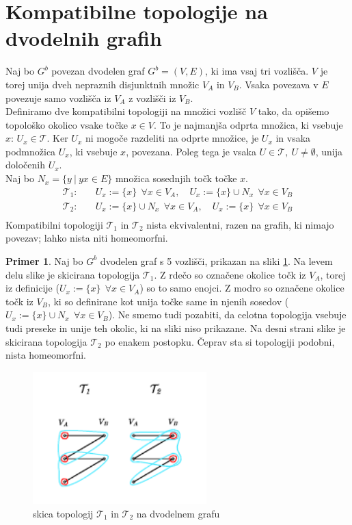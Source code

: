 \documentclass[a4paper, 12pt]{book}
\theoremstyle{definition}
\newtheorem{example}{Primer}[section]
\theoremstyle{remark}
\begin{document}
\section{Kompatibilne topologije na dvodelnih grafih}
Naj bo $G^b$ povezan dvodelen graf $G^b = (V,E)$, ki ima vsaj tri vozlišča.
$V$ je torej unija dveh nepraznih disjunktnih množic $V_A$ in $V_B$. Vsaka
povezava v $E$ povezuje samo vozlišča iz $V_A$ z vozlišči iz $V_B$.\\
Definiramo dve kompatibilni topologiji na množici vozlišč $V$ tako, da opišemo
topološko okolico vsake točke $x \in V$. To je najmanjša odprta množica, ki
vsebuje $x$: $U_x \in \mathcal{T}$. Ker $U_x$ ni mogoče razdeliti na odprte množice, je $U_x$
in vsaka podmnožica $U_x$, ki vsebuje $x$, povezana.
Poleg tega je vsaka $U \in \mathcal{T},\ U \neq \emptyset$, unija določenih $U_x$.\\
Naj bo $N_x = \{y \  | \  yx \in E\}$ množica sosednjih točk točke $x$.\\
\[
  \begin{split}
  \mathcal{T}_1:&\quad
  U_x:=\{x\}\ \ \forall x \in V_A, \quad
  U_x:=\{x\}\cup N_x\ \  \forall x \in V_B\\
  \mathcal{T}_2:&\quad
  U_x:=\{x\}\cup N_x\ \  \forall x \in V_A, \quad
  U_x:=\{x\}\ \ \forall x \in V_B\\
\end{split}
\]
Kompatibilni topologiji $\mathcal{T}_1$ in $\mathcal{T}_2$ nista ekvivalentni, razen na grafih,
ki nimajo povezav; lahko nista niti homeomorfni.
\begin{example}
  Naj bo $G^b$ dvodelen graf s 5 vozlišči, prikazan na sliki \ref{t1t2_skica}. Na levem 
  delu slike je skicirana topologija $\mathcal{T}_1$. Z rdečo so označene okolice točk iz $V_A$,
  torej iz definicije ($U_x:=\{x\}\ \ \forall x \in V_A$) so to samo enojci. Z modro so označene
  okolice točk iz $V_B$, ki so definirane kot unija točke same in njenih sosedov
  ($U_x:=\{x\}\cup N_x\ \  \forall x \in V_B$). Ne smemo tudi pozabiti, da celotna topologija
  vsebuje tudi preseke in unije teh okolic, ki na sliki niso prikazane. Na desni strani slike
  je skicirana topologija $\mathcal{T}_2$ po enakem postopku. Čeprav sta si topologiji podobni,
  nista homeomorfni.

  \begin{figure}
    \begin{center}
    \includegraphics[width=0.6\textwidth]{t1t2_skica.pdf}
    \end{center}
    \caption{skica topologij $\mathcal{T}_1$ in $\mathcal{T}_2$ na dvodelnem grafu}
    \label{t1t2_skica}
  \end{figure}
\end{example}
\end{document}
